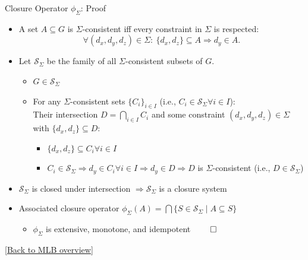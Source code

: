 \begin{frame}{Closure Operator $\phi_{\Sigma}$: Proof}
\hypertarget{appendix:closure-proof}{}
\begin{itemize}
    \item A set $A \subseteq G$ is $\Sigma$-consistent iff every constraint in $\Sigma$ is respected:
    \[
      \forall(d_x,d_y,d_z)\in\Sigma:\ \{d_x,d_z\}\subseteq A \Rightarrow d_y\in A .
    \]
    \item Let $\mathcal{S}_{\Sigma}$ be the family of all $\Sigma$-consistent subsets of $G$.
    \begin{itemize}
      \item[$\Rightarrow$] $G \in \mathcal{S}_{\Sigma}$
      \item[$\Rightarrow$] For any $\Sigma$-consistent sets $\{C_i\}_{i\in I}$ (i.e., $C_i \in \mathcal{S}_{\Sigma} \forall i \in I$):\\
      Their intersection $D = \bigcap_{i \in I} C_i$ and
      some constraint $(d_x, d_y, d_z) \in \Sigma$ with $\{d_x, d_z\} \subseteq D$: 
      \begin{itemize}
      \item[$\overset{\mathrm{Def.}}{\Rightarrow}$] $\{d_x, d_z\} \subseteq C_i \forall i \in I$
      \item[$\Rightarrow$] $C_i \in \mathcal{S}_{\Sigma} 
      \Rightarrow d_y \in C_i \forall i \in I 
      \Rightarrow d_y \in D 
      \Rightarrow D$ is $\Sigma$-consistent (i.e., $D \in \mathcal{S}_{\Sigma}$)
      \end{itemize}
    \end{itemize}
    \item $\mathcal{S}_{\Sigma}$ is closed under intersection $\Rightarrow \mathcal{S}_{\Sigma}$ is a closure system
    \item Associated closure operator $\phi_{\Sigma}(A)=\bigcap \{ S \in \mathcal{S}_{\Sigma} \mid A \subseteq S \}$
    \begin{itemize}
      \item $\phi_{\Sigma}$ is extensive, monotone, and idempotent $\qed$
    \end{itemize}

\end{itemize}
\vfill
{\tiny[\hyperlink{main:mlb-constraints}{Back to MLB overview}]}
\end{frame}

